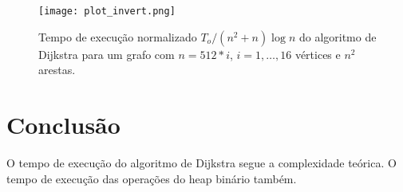\documentclass{article}
\begin{document}
\begin{figure}
  \centering
  \texttt{[image: plot\_invert.png]}
  \caption{Tempo de execução normalizado $T_o/(n^2+n)\log n$ do algoritmo de Dijkstra para um grafo com $n=512 * i$, $i=1,\ldots,16$ vértices e $n ^ 2$ arestas.}
  \label{fig2}
\end{figure}

\section{Conclusão}

O tempo de execução do algoritmo de Dijkstra segue a complexidade teórica.
O tempo de execução das operações do heap binário também.

\printbibliography
\end{document}
